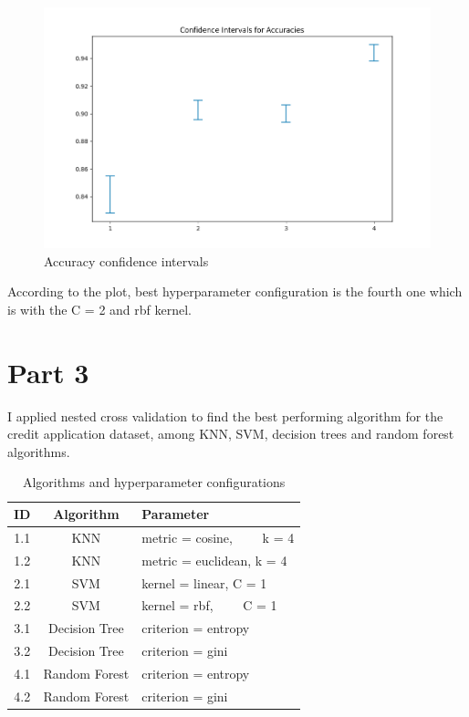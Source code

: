 \documentclass[12pt,a4paper, margin=1in]{article}
\begin{document}
\begin{figure}[H]
    \centering
    \includegraphics[scale=0.75]{svm_dataset2_ci.png}
    \caption{Accuracy confidence intervals}
\end{figure}

According to the plot, best hyperparameter configuration is the fourth one which is with the C = 2 and rbf kernel.

\pagebreak

\section{Part 3}

I applied nested cross validation to find the best performing algorithm for the credit application dataset, among KNN, SVM, decision trees and random forest algorithms.

\bigskip
\begin{table}[H]
    \centering
    \begin{tabular}{|c|c|l|}
    \hline
    \textbf{ID} & \textbf{Algorithm} & \textbf{Parameter} \\ \hline
    1.1           & KNN        & metric = cosine, \ \ \ \ k = 4           \\ \hline
    1.2           & KNN        & metric = euclidean, k = 4     \\ \hline
    2.1           & SVM        & kernel = linear, C = 1        \\ \hline
    2.2           & SVM        & kernel = rbf, \ \ \ \ C = 1    \\ \hline
    3.1           & Decision Tree        & criterion = entropy           \\ \hline
    3.2           & Decision Tree        & criterion = gini   \\ \hline
    4.1           & Random Forest          & criterion = entropy         \\ \hline
    4.2           & Random Forest          & criterion = gini    \\ \hline
    \end{tabular}
    \caption{Algorithms and hyperparameter configurations}
\end{table}
\bigskip
\end{document}
